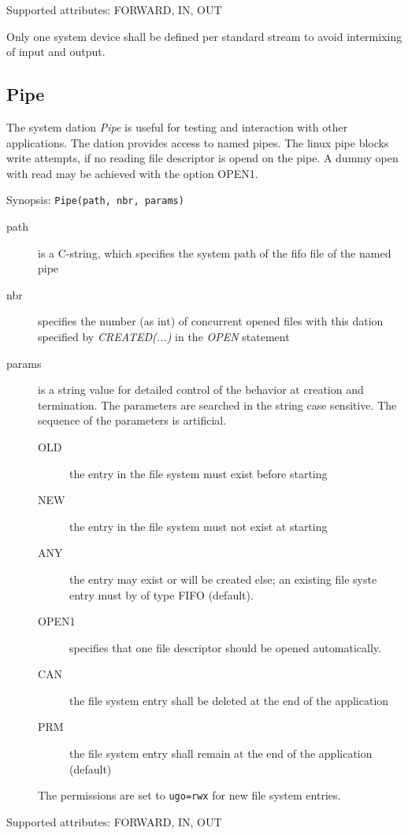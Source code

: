 Supported attributes: FORWARD, IN, OUT

Only one system device shall be defined per standard stream to avoid
intermixing of input and output.

\subsection{Pipe}
The system dation {\em Pipe} is useful for testing and interaction with
other applications. The dation provides access to named pipes.
The linux pipe blocks write attempts, if no reading file descriptor
is opend on the pipe. 
A dummy open with read may be achieved with the option OPEN1.

Synopsis: \verb|Pipe(path, nbr, params)|

\begin{description}
\item [path] is a C-string, which specifies the system path of the fifo file
    of the named pipe
\item[nbr] specifies the number (as int) of concurrent opened files with this dation
     specified by {\em CREATED(...)} in the {\em OPEN} statement
\item [params] is a string value for detailed control of the behavior
     at creation and termination. The parameters are searched in the string
     case sensitive. The sequence of the parameters is artificial.
   \begin{description}
     \item[OLD] the entry in the file system must exist before starting
     \item[NEW] the entry in the file system must not exist at starting
     \item[ANY] the entry may exist or will be created else; an existing
                file syste entry must by of type FIFO (default).
     \item[OPEN1] specifies that one file descriptor should be opened 
                automatically.
     \item[CAN] the file system entry shall be deleted at the end of the 
                application
     \item[PRM] the file system entry shall remain at the end of the
                application (default)
   \end{description} 
   The permissions are set to \verb|ugo=rwx| for new file system entries.
\end{description}

Supported attributes: FORWARD, IN, OUT

